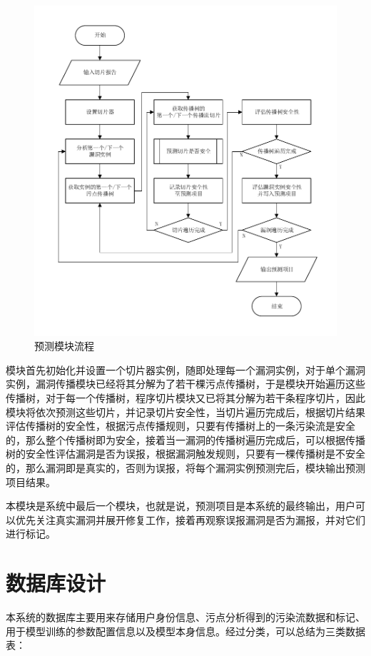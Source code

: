 \begin{figure}[htbp]
    \centering
    \includegraphics[width=0.9\linewidth]{FIGs/chapter3/predictProcessing.pdf}
    \caption{预测模块流程}\label{predictProcessing}
\end{figure}

模块首先初始化并设置一个切片器实例，随即处理每一个漏洞实例，对于单个漏洞实例，漏洞传播模块已经将其分解为了若干棵污点传播树，于是模块开始遍历这些传播树，对于每一个传播树，程序切片模块又已将其分解为若干条程序切片，因此模块将依次预测这些切片，并记录切片安全性，当切片遍历完成后，根据切片结果评估传播树的安全性，根据污点传播规则，只要有传播树上的一条污染流是安全的，那么整个传播树即为安全，接着当一漏洞的传播树遍历完成后，可以根据传播树的安全性评估漏洞是否为误报，根据漏洞触发规则，只要有一棵传播树是不安全的，那么漏洞即是真实的，否则为误报，将每个漏洞实例预测完后，模块输出预测项目结果。

本模块是系统中最后一个模块，也就是说，预测项目是本系统的最终输出，用户可以优先关注真实漏洞并展开修复工作，接着再观察误报漏洞是否为漏报，并对它们进行标记。

\section{数据库设计}
本系统的数据库主要用来存储用户身份信息、污点分析得到的污染流数据和标记、用于模型训练的参数配置信息以及模型本身信息。经过分类，可以总结为三类数据表：


